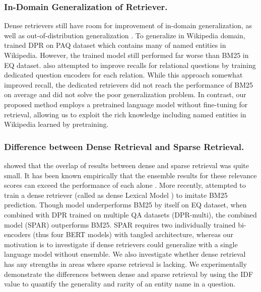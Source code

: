 \documentclass[letterpaper]{article} \usepackage{aaai23}  \usepackage{times}  \usepackage{helvet}  \usepackage{courier}  \usepackage[hyphens]{url}  \usepackage{graphicx} \urlstyle{rm} \def\UrlFont{\rm}  \usepackage{natbib}  \usepackage{caption} \frenchspacing  \setlength{\pdfpagewidth}{8.5in}  \setlength{\pdfpageheight}{11in}  \usepackage{algorithm}
\begin{document}
\subsubsection{In-Domain Generalization of Retriever.}
Dense retrievers still have room for improvement of in-domain generalization, as well as out-of-distribution generalization \citep{thakur2021beir}.
To generalize in Wikipedia domain, \citet{sciavolino-etal-2021-simple} trained DPR on PAQ dataset \citep{lewis-etal-2021-paq} which contains many of named entities in Wikipedia.
However, the trained model still performed far worse than BM25 in EQ dataset.
\citet{sciavolino-etal-2021-simple} also attempted to improve recalls for relational questions by training dedicated question encoders for each relation.
While this approach somewhat improved recall, the dedicated retrievers did not reach the performance of BM25 on average and did not solve the poor generalization problem.
In contrast, our proposed method employs a pretrained language model without fine-tuning for retrieval, allowing us to exploit the rich knowledge including named entities in Wikipedia learned by pretraining.

\subsubsection{Difference between Dense Retrieval and Sparse Retrieval.}
\citet{replication_dpr} showed that the overlap of results between dense and sparse retrieval was quite small.
It has been known empirically that the ensemble results for these relevance scores can exceed the performance of each alone \citep[e.g.,][]{karpukhin-etal-2020-dense}.
More recently, \citet{Chen2021SalientPA} attempted to train a dense retriever (called as dense Lexical Model ) to imitate BM25 prediction.
Though  model underperforms BM25 by itself on EQ dataset, when combined with DPR trained on multiple QA datasets (DPR-multi), the combined model (SPAR) outperforms BM25.
SPAR requires two individually trained bi-encoders (thus four BERT models) with tangled architecture, whereas our motivation is to investigate if dense retrievers could generalize with a single language model without ensemble.
We also investigate whether dense retrieval has any strengths in areas where sparse retrieval is lacking.
We experimentally demonstrate the differences between dense and sparse retrieval by using the IDF value to quantify the generality and rarity of an entity name in a question.
\end{document}
